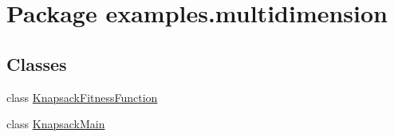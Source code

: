 \hypertarget{namespaceexamples_1_1multidimension}{\section{Package examples.\-multidimension}
\label{namespaceexamples_1_1multidimension}
}
\subsection*{Classes}
\begin{DoxyCompactItemize}
\item 
class \hyperlink{classexamples_1_1multidimension_1_1_knapsack_fitness_function}{Knapsack\-Fitness\-Function}
\item 
class \hyperlink{classexamples_1_1multidimension_1_1_knapsack_main}{Knapsack\-Main}
\end{DoxyCompactItemize}
